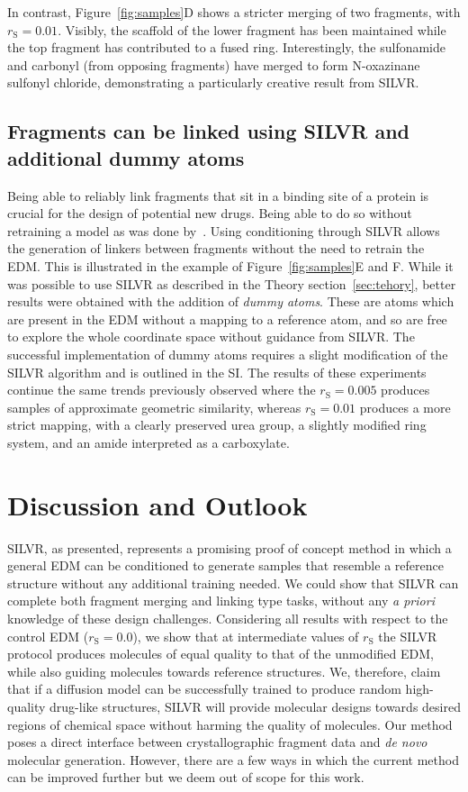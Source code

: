 \documentclass[journal=jacsat,manuscript=article]{achemso}
\begin{document}
In contrast, Figure~\ref{fig:samples}D shows a stricter merging of two fragments, with $r_{\mathrm{S}}=0.01$. Visibly, the scaffold of the lower fragment has been maintained while the top fragment has contributed to a fused ring. Interestingly, the sulfonamide and carbonyl (from opposing fragments) have merged to form N-oxazinane sulfonyl chloride, demonstrating a particularly creative result from SILVR. 

\subsection{Fragments can be linked using SILVR and additional dummy atoms}
\label{sec:linker}
Being able to reliably link fragments that sit in a binding site of a protein is crucial for the design of potential new drugs. Being able to do so without retraining a model as was done by~\cite{huang20223dlinker}. Using conditioning through SILVR allows the generation of linkers between fragments without the need to retrain the EDM. This is illustrated in the example of Figure~\ref{fig:samples}E and F. While it was possible to use SILVR as described in the Theory section~\ref{sec:tehory}, better results were obtained with the addition of \textit{dummy atoms}. These are atoms which are present in the EDM without a mapping to a reference atom, and so are free to explore the whole coordinate space without guidance from SILVR. The successful implementation of dummy atoms requires a slight modification of the SILVR algorithm and is outlined in the SI. The results of these experiments continue the same trends previously observed where the $r_{\mathrm{S}}=0.005$ produces samples of approximate geometric similarity, whereas $r_{\mathrm{S}}=0.01$ produces a more strict mapping, with a clearly preserved urea group, a slightly modified ring system, and an amide interpreted as a carboxylate.

\section{Discussion and Outlook}
\label{sec:discussion}
SILVR, as presented, represents a promising proof of concept method in which a general EDM can be conditioned to generate samples that resemble a reference structure without any additional training needed. We could show that SILVR can complete both fragment merging and linking type tasks, without any \textit{a priori} knowledge of these design challenges. Considering all results with respect to the control EDM ($r_{\mathrm{S}}=0.0$), we show that at intermediate values of $r_{\mathrm{S}}$ the SILVR protocol produces molecules of equal quality to that of the unmodified EDM, while also guiding molecules towards reference structures. We, therefore, claim that if a diffusion model can be successfully trained to produce random high-quality drug-like structures, SILVR will provide molecular designs towards desired regions of chemical space without harming the quality of molecules. Our method poses a direct interface between crystallographic fragment data and \textit{de novo} molecular generation. However, there are a few ways in which the current method can be improved further but we deem out of scope for this work. 
\end{document}
